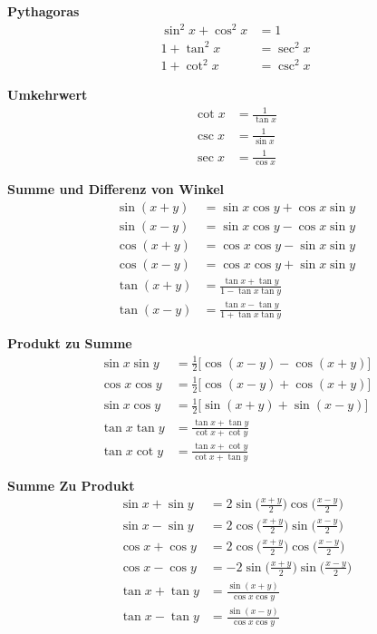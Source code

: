 \begin{multicols}{2}
    \textbf{Pythagoras}
    \begin{align*}
        \sin^2 x + \cos^2 x & = 1        \\
        1 + \tan^2 x        & = \sec^2 x \\
        1 + \cot^2 x        & = \csc^2 x
    \end{align*}

    \textbf{Umkehrwert}
    \begin{align*}
        \cot x & = \frac{1}{\tan x} \\
        \csc x & = \frac{1}{\sin x} \\
        \sec x & = \frac{1}{\cos x}
    \end{align*}

    \textbf{Summe und Differenz von Winkel}
    \begin{align*}
        \sin(x + y) & = \sin x \cos y + \cos x \sin y             \\
        \sin(x - y) & = \sin x \cos y - \cos x \sin y             \\
        \cos(x + y) & = \cos x \cos y - \sin x \sin y             \\
        \cos(x - y) & = \cos x \cos y + \sin x \sin y             \\
        \tan(x + y) & = \frac{\tan x + \tan y}{1 - \tan x \tan y} \\
        \tan(x - y) & = \frac{\tan x - \tan y}{1 + \tan x \tan y}
    \end{align*}

    \textbf{Produkt zu Summe}
    \begin{align*}
        \sin x \sin y & = \frac{1}{2}\big[\cos(x - y) - \cos(x + y)\big] \\
        \cos x \cos y & = \frac{1}{2}\big[\cos(x - y) + \cos(x + y)\big] \\
        \sin x \cos y & = \frac{1}{2}\big[\sin(x + y) + \sin(x - y)\big] \\
        \tan x \tan y & = \frac{ \tan x + \tan y }{ \cot x + \cot y }    \\
        \tan x \cot y & = \frac{ \tan x + \cot y }{ \cot x + \tan y }
    \end{align*}

    \textbf{Summe Zu Produkt}
    \begin{align*}
        \sin x + \sin y & = 2 \sin \Big( \frac{x + y}{2} \Big) \cos \Big( \frac{x - y}{2} \Big)  \\
        \sin x - \sin y & = 2 \cos \Big( \frac{x + y}{2} \Big) \sin \Big( \frac{x - y}{2} \Big)  \\
        \cos x + \cos y & = 2 \cos \Big( \frac{x + y}{2} \Big) \cos \Big( \frac{x - y}{2} \Big)  \\
        \cos x - \cos y & = -2 \sin \Big( \frac{x + y}{2} \Big) \sin \Big( \frac{x - y}{2} \Big) \\
        \tan x + \tan y & = \frac{ \sin(x + y) }{ \cos x \cos y}                                 \\
        \tan x - \tan y & = \frac{ \sin(x - y) }{ \cos x \cos y}                                 \\
    \end{align*}


\end{multicols}

